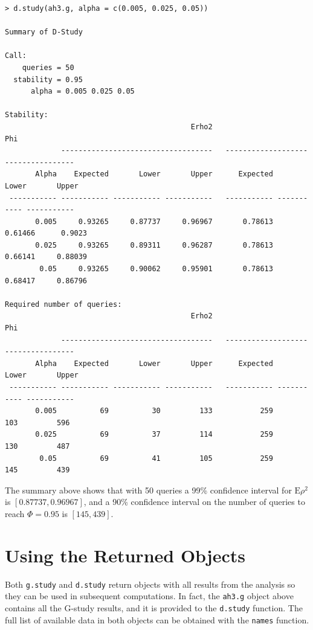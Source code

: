 \documentclass[twoside]{article}
\begin{document}
{\small\begin{verbatim}
> d.study(ah3.g, alpha = c(0.005, 0.025, 0.05))

Summary of D-Study

Call:
    queries = 50 
  stability = 0.95 
      alpha = 0.005 0.025 0.05 

Stability:
                                           Erho2                                   Phi
             -----------------------------------   -----------------------------------
       Alpha    Expected       Lower       Upper      Expected       Lower       Upper
 ----------- ----------- ----------- -----------   ----------- ----------- -----------
       0.005     0.93265     0.87737     0.96967       0.78613     0.61466      0.9023 
       0.025     0.93265     0.89311     0.96287       0.78613     0.66141     0.88039 
        0.05     0.93265     0.90062     0.95901       0.78613     0.68417     0.86796 

Required number of queries:
                                           Erho2                                   Phi
             -----------------------------------   -----------------------------------
       Alpha    Expected       Lower       Upper      Expected       Lower       Upper
 ----------- ----------- ----------- -----------   ----------- ----------- -----------
       0.005          69          30         133           259         103         596 
       0.025          69          37         114           259         130         487 
        0.05          69          41         105           259         145         439
\end{verbatim}}

The summary above shows that with 50 queries a 99\% confidence interval for $\text{E}\rho^2$ is $[0.87737, 0.96967]$, and a 90\% confidence interval on the number of queries to reach $\Phi=0.95$ is $[145, 439]$.


\section{Using the Returned Objects}

Both \texttt{g.study} and \texttt{d.study} return objects with all results from the analysis so they can be used in subsequent computations. In fact, the \texttt{ah3.g} object above contains all the G-study results, and it is provided to the \texttt{d.study} function.
The full list of available data in both objects can be obtained with the \texttt{names} function.
\end{document}
